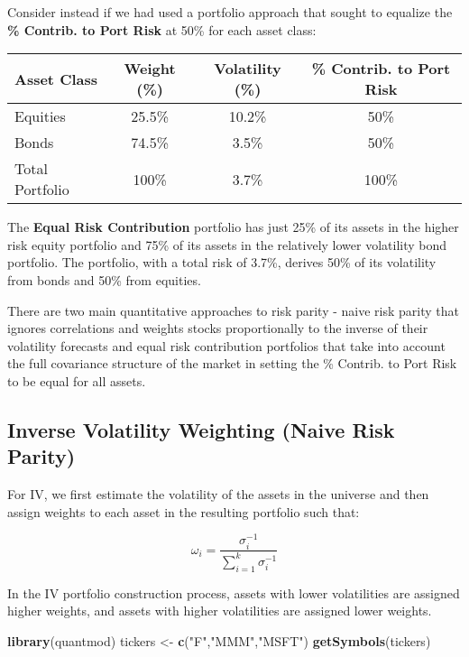 \documentclass[]{book}
\newenvironment{Shaded}{\begin{snugshade}}{\end{snugshade}}
\newcommand{\KeywordTok}[1]{\textcolor[rgb]{0.13,0.29,0.53}{\textbf{#1}}}
\newcommand{\StringTok}[1]{\textcolor[rgb]{0.31,0.60,0.02}{#1}}
\newcommand{\NormalTok}[1]{#1}
\theoremstyle{definition}
\theoremstyle{definition}
\theoremstyle{definition}
\theoremstyle{remark}
\begin{document}
Consider instead if we had used a portfolio approach that sought to
equalize the \textbf{\% Contrib. to Port Risk} at 50\% for each asset
class:

\begin{longtable}[]{@{}lccc@{}}
\toprule
Asset Class & Weight (\%) & Volatility (\%) & \% Contrib. to Port
Risk\tabularnewline
\midrule
\endhead
Equities & 25.5\% & 10.2\% & 50\%\tabularnewline
Bonds & 74.5\% & 3.5\% & 50\%\tabularnewline
Total Portfolio & 100\% & 3.7\% & 100\%\tabularnewline
\bottomrule
\end{longtable}

The \textbf{Equal Risk Contribution} portfolio has just 25\% of its
assets in the higher risk equity portfolio and 75\% of its assets in the
relatively lower volatility bond portfolio. The portfolio, with a total
risk of 3.7\%, derives 50\% of its volatility from bonds and 50\% from
equities.

There are two main quantitative approaches to risk parity - naive risk
parity that ignores correlations and weights stocks proportionally to
the inverse of their volatility forecasts and equal risk contribution
portfolios that take into account the full covariance structure of the
market in setting the \% Contrib. to Port Risk to be equal for all
assets.

\subsection{Inverse Volatility Weighting (Naive Risk
Parity)}\label{inverse-volatility-weighting-naive-risk-parity}

For IV, we first estimate the volatility of the assets in the universe
and then assign weights to each asset in the resulting portfolio such
that:

\[
\omega_i = \frac{\sigma^{-1}_i}{\sum_{i=1}^k \sigma^{-1}_i}
\]

In the IV portfolio construction process, assets with lower volatilities
are assigned higher weights, and assets with higher volatilities are
assigned lower weights.

\begin{Shaded}
\begin{Highlighting}[]
\KeywordTok{library}\NormalTok{(quantmod)}
\NormalTok{tickers <-}\StringTok{ }\KeywordTok{c}\NormalTok{(}\StringTok{"F"}\NormalTok{,}\StringTok{"MMM"}\NormalTok{,}\StringTok{"MSFT"}\NormalTok{)}
\KeywordTok{getSymbols}\NormalTok{(tickers)}
\end{Highlighting}
\end{Shaded}
\end{document}
